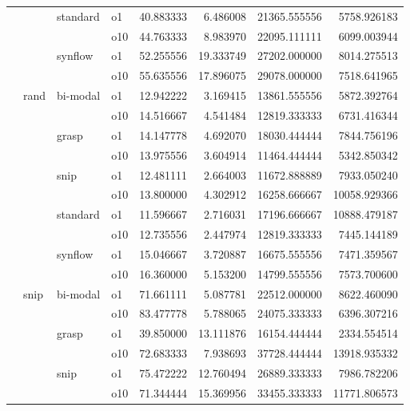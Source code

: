 \begin{longtable}{llllrrrr}
      &     & standard & o1 &  40.883333 &   6.486008 &     21365.555556 &   5758.926183 \\
      &     &         & o10 &  44.763333 &   8.983970 &     22095.111111 &   6099.003944 \\
      &     & synflow & o1 &  52.255556 &  19.333749 &     27202.000000 &   8014.275513 \\
      &     &         & o10 &  55.635556 &  17.896075 &     29078.000000 &   7518.641965 \\
      & rand & bi-modal & o1 &  12.942222 &   3.169415 &     13861.555556 &   5872.392764 \\
      &     &         & o10 &  14.516667 &   4.541484 &     12819.333333 &   6731.416344 \\
      &     & grasp & o1 &  14.147778 &   4.692070 &     18030.444444 &   7844.756196 \\
      &     &         & o10 &  13.975556 &   3.604914 &     11464.444444 &   5342.850342 \\
      &     & snip & o1 &  12.481111 &   2.664003 &     11672.888889 &   7933.050240 \\
      &     &         & o10 &  13.800000 &   4.302912 &     16258.666667 &  10058.929366 \\
      &     & standard & o1 &  11.596667 &   2.716031 &     17196.666667 &  10888.479187 \\
      &     &         & o10 &  12.735556 &   2.447974 &     12819.333333 &   7445.144189 \\
      &     & synflow & o1 &  15.046667 &   3.720887 &     16675.555556 &   7471.359567 \\
      &     &         & o10 &  16.360000 &   5.153200 &     14799.555556 &   7573.700600 \\
      & snip & bi-modal & o1 &  71.661111 &   5.087781 &     22512.000000 &   8622.460090 \\
      &     &         & o10 &  83.477778 &   5.788065 &     24075.333333 &   6396.307216 \\
      &     & grasp & o1 &  39.850000 &  13.111876 &     16154.444444 &   2334.554514 \\
      &     &         & o10 &  72.683333 &   7.938693 &     37728.444444 &  13918.935332 \\
      &     & snip & o1 &  75.472222 &  12.760494 &     26889.333333 &   7986.782206 \\
      &     &         & o10 &  71.344444 &  15.369956 &     33455.333333 &  11771.806573 \\

\end{longtable}
